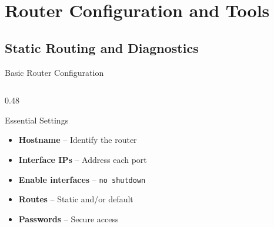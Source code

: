 \documentclass[aspectratio=169]{beamer}  %
\begin{document}
\section{Router Configuration and Tools}
\subsection{Static Routing and Diagnostics}


\begin{frame}{Basic Router Configuration}
    \begin{columns}[T]
        \begin{column}{0.48\textwidth}
            \begin{block}{Essential Settings}
                \small
                \begin{itemize}\setlength{\itemsep}{2pt}
                    \item \textbf{Hostname} -- Identify the router
                    \item \textbf{Interface IPs} -- Address each port
                    \item \textbf{Enable interfaces} -- \texttt{no shutdown}
                    \item \textbf{Routes} -- Static and/or default
                    \item \textbf{Passwords} -- Secure access
                \end{itemize}
            \end{block}
            

\end{column}
\end{columns}
\end{frame}
\end{document}
